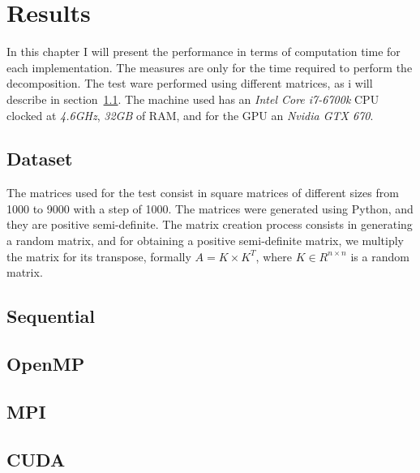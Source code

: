 \chapter{Results}
\label{results_computations}
In this chapter I will present the performance in terms of computation time for each implementation. The measures are only for the time required to perform the decomposition. The test ware performed using different matrices, as i will describe in section~\ref{Dataset}. The machine used has an \textit{Intel Core i7-6700k} CPU clocked at \textit{4.6GHz}, \textit{32GB} of RAM, and for the GPU an \textit{Nvidia GTX 670}.
\section{Dataset}
\label{Dataset}
The matrices used for the test consist in square matrices of different sizes from 1000 to 9000 with a step of 1000. The matrices were generated using Python, and they are positive semi-definite. The matrix creation process consists in generating a random matrix, and for obtaining a positive semi-definite matrix, we multiply the matrix for its transpose, formally $A = K \times K^{T}$, where $K \in R^{n \times n}$ is a random matrix. 

\section{Sequential}
\section{OpenMP}
\section{MPI}
\section{CUDA}